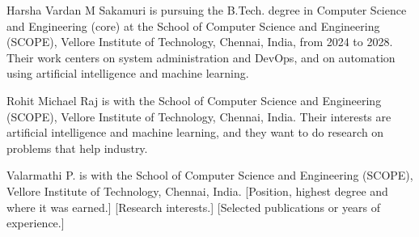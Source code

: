 \documentclass{IEEEtaes}
\begin{document}



\begin{IEEEbiographynophoto}{Harsha Vardan M Sakamuri}
is pursuing the B.Tech. degree in Computer Science and Engineering (core) at the School of Computer Science and Engineering (SCOPE), Vellore Institute of Technology, Chennai, India, from 2024 to 2028. Their work centers on system administration and DevOps, and on automation using artificial intelligence and machine learning.
\end{IEEEbiographynophoto}

\begin{IEEEbiographynophoto}{Rohit Michael Raj}
is with the School of Computer Science and Engineering (SCOPE), Vellore Institute of Technology, Chennai, India. Their interests are artificial intelligence and machine learning, and they want to do research on problems that help industry.
\end{IEEEbiographynophoto}

\begin{IEEEbiographynophoto}{Valarmathi P.}
is with the School of Computer Science and Engineering (SCOPE), Vellore Institute of Technology, Chennai, India. [Position, highest degree and where it was earned.] [Research interests.] [Selected publications or years of experience.]
\end{IEEEbiographynophoto}
\end{document}
